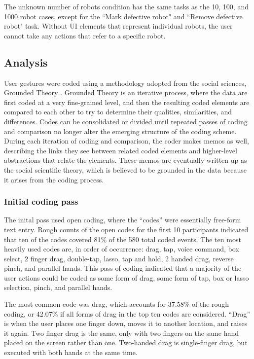 The unknown number of robots condition has the same tasks as the 10, 100, and 1000 robot cases, except for the ``Mark defective robot" and ``Remove defective robot" task. 
Without UI elements that represent individual robots, the user cannot take any actions that refer to a specific robot. 

\subsection{Analysis}

User gestures were coded using a methodology adopted from the social sciences, Grounded Theory .
Grounded Theory is an iterative process, where the data are first coded at a very fine-grained level, and then the resulting coded elements are compared to each other to try to determine their qualities, similarities, and differences. 
Codes can be consolidated or divided until repeated passes of coding and comparison no longer alter the emerging structure of the coding scheme. 
During each iteration of coding and comparison, the coder makes memos as well, describing the links they see between related coded elements and higher-level abstractions that relate the elements. 
These memos are eventually written up as the social scientific theory, which is believed to be grounded in the data because it arises from the coding process. 

\subsubsection{Initial coding pass}

The inital pass used open coding, where the ``codes'' were essentially free-form text entry. 
Rough counts of the open codes for the first 10 participants indicated that ten of the codes covered 81\% of the 580 total coded events. 
The ten most heavily used codes are, in order of occurrence: drag, tap, voice command, box select, 2 finger drag, double-tap, lasso, tap and hold, 2 handed drag, reverse pinch, and parallel hands. 
This pass of coding indicated that a majority of the user actions could be coded as some form of drag, some form of tap, box or lasso selection, pinch, and parallel hands. 

The most common code was drag, which accounts for 37.58\% of the rough coding, or 42.07\% if all forms of drag in the top ten codes are considered. ``Drag'' is when the user places one finger down, moves it to another location, and raises it again. Two finger drag is the same, only with two fingers on the same hand placed on the screen rather than one. Two-handed drag is single-finger drag, but executed with both hands at the same time. 

